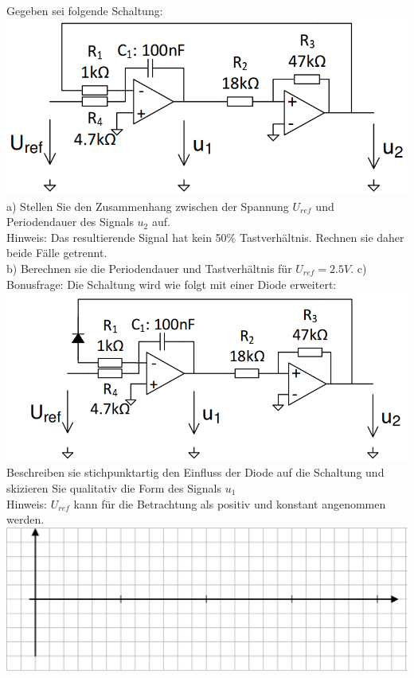 \documentclass[A4]{scrartcl}
\begin{document}
  Gegeben sei folgende Schaltung:\\
  \includegraphics{Schaltung15.png}\\
  a) Stellen Sie den Zusammenhang zwischen der Spannung $U_{ref}$ und Periodendauer des Signals $u_2$ auf.\\
  Hinweis: Das resultierende Signal hat kein 50\% Tastverhältnis. Rechnen sie daher beide Fälle getrennt.\\
  b) Berechnen sie die Periodendauer und Tastverhältnis für $U_{ref} = 2.5V$.
  c) Bonusfrage: Die Schaltung wird wie folgt mit einer Diode erweitert:\\
  \includegraphics{Schaltung16.png}\\
  Beschreiben sie stichpunktartig den Einfluss der Diode auf die Schaltung und skizieren Sie qualitativ die Form des Signals $u_1$\\
  Hinweis: $U_{ref}$ kann für die Betrachtung als positiv und konstant angenommen werden.\\
  \includegraphics{pot_dia.png}
\end{document}
